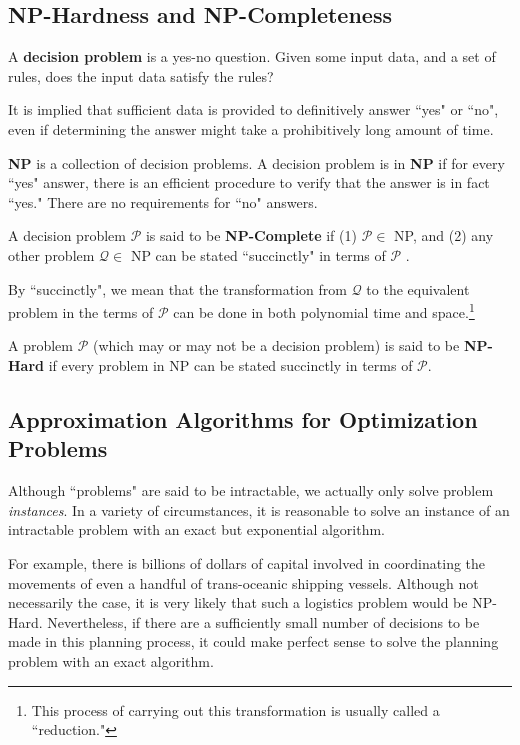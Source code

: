 \subsection{NP-Hardness and NP-Completeness}
\begin{ILdefinition}
A \textbf{decision problem} is a yes-no question.
Given some input data, and a set of rules, does the input data satisfy the rules?
\end{ILdefinition}
It is implied that sufficient data is provided to definitively answer ``yes" or ``no", even if determining the answer might take a prohibitively long amount of time.
\begin{ILdefinition}
\textbf{NP} is a collection of decision problems. A decision problem is in \textbf{NP} if for every ``yes" answer, there is an efficient procedure to verify that the answer is in fact ``yes." 
There are no requirements for ``no" answers.
\end{ILdefinition}
\begin{ILdefinition}
A decision problem $\mathcal{P}$ is said to be \textbf{NP-Complete} if (1)
$\mathcal{P} \in $ NP, and (2) any other problem $\mathcal{Q} \in$ NP can be stated ``succinctly" in terms of $\mathcal{P}$ .
\end{ILdefinition}
By ``succinctly", we mean that the transformation from $\mathcal{Q}$ to the equivalent problem in the terms of $\mathcal{P}$ can be done in both polynomial time and space.\footnote{This process of carrying out this transformation is usually called a ``reduction."}
\begin{ILdefinition}
A problem $\mathcal{P}$ (which may or may not be a decision problem) is said to be \textbf{NP-Hard} if every problem in NP can be stated succinctly in terms of $\mathcal{P}$.
\end{ILdefinition}

\subsection{Approximation Algorithms for Optimization Problems}\label{subsec:intractProbCope}

Although ``problems" are said to be intractable, we actually only solve problem \textit{instances}. 
In a variety of circumstances, it is reasonable to solve an instance of an intractable problem with an exact but exponential algorithm.

For example, there is billions of dollars of capital involved in coordinating the movements of even a handful of trans-oceanic shipping vessels. 
Although not necessarily the case, it is very likely that such a logistics problem would be NP-Hard.
Nevertheless, if there are a sufficiently small number of decisions to be made in this planning process, it could make perfect sense to solve the planning problem with an exact algorithm.

